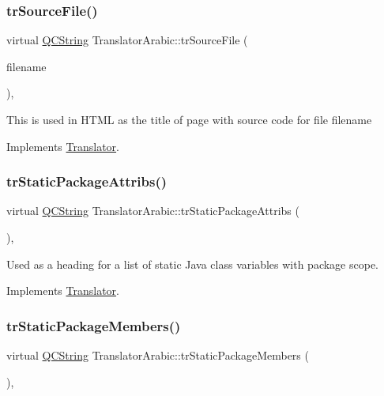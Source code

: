 \subsubsection{\texorpdfstring{trSourceFile()}{trSourceFile()}}
{\footnotesize\ttfamily virtual \mbox{\hyperlink{class_q_c_string}{Q\+C\+String}} Translator\+Arabic\+::tr\+Source\+File (\begin{DoxyParamCaption}\item[{\mbox{\hyperlink{class_q_c_string}{Q\+C\+String}} \&}]{filename }\end{DoxyParamCaption})\hspace{0.3cm}{\ttfamily [inline]}, {\ttfamily [virtual]}}

This is used in H\+T\+ML as the title of page with source code for file filename 

Implements \mbox{\hyperlink{class_translator}{Translator}}.

\mbox{\label{class_translator_arabic_ae21911cb6b577cae069bdb9a402b8513}} 
\subsubsection{\texorpdfstring{trStaticPackageAttribs()}{trStaticPackageAttribs()}}
{\footnotesize\ttfamily virtual \mbox{\hyperlink{class_q_c_string}{Q\+C\+String}} Translator\+Arabic\+::tr\+Static\+Package\+Attribs (\begin{DoxyParamCaption}{ }\end{DoxyParamCaption})\hspace{0.3cm}{\ttfamily [inline]}, {\ttfamily [virtual]}}

Used as a heading for a list of static Java class variables with package scope. 

Implements \mbox{\hyperlink{class_translator}{Translator}}.

\mbox{\label{class_translator_arabic_a9196ff5e4aec8c51f04d2ab7ce81b911}} 
\subsubsection{\texorpdfstring{trStaticPackageMembers()}{trStaticPackageMembers()}}
{\footnotesize\ttfamily virtual \mbox{\hyperlink{class_q_c_string}{Q\+C\+String}} Translator\+Arabic\+::tr\+Static\+Package\+Members (\begin{DoxyParamCaption}{ }\end{DoxyParamCaption})\hspace{0.3cm}{\ttfamily [inline]}, {\ttfamily [virtual]}}

